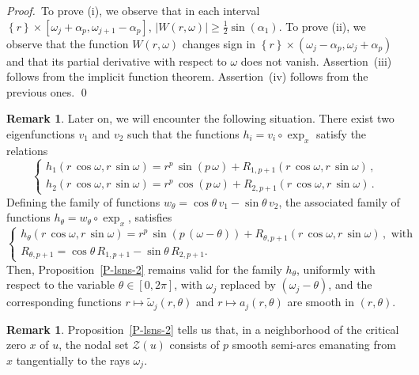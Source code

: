 \documentclass[12pt,a4paper]{amsart}
\theoremstyle{plain} %
\theoremstyle{definition}
\newtheorem{remark}[theorem]{Remark}
\numberwithin{equation}{section}
\numberwithin{figure}{section}
\numberwithin{table}{section}
\newcommand{\cZ}{\mathcal{Z}}
\newcommand{\pf}{\emph{Proof.~}}
\newcommand{\set}[1]{\left\lbrace #1 \right\rbrace}
\newcommand{\omegat}{\widetilde{\omega}}
\begin{document}
\pf To prove (i), we observe that in each interval $\set{r} \times \left[ \omega_j+\alpha_p,\omega_{j+1}-\alpha_p\right]$, $|W(r,\omega)| \ge \frac 12 \sin(\alpha_1)$. To prove (ii), we observe that the function $W(r,\omega)$ changes sign in $\set{r}\times \left( \omega_j-\alpha_p,\omega_j+\alpha_p\right)$ and that its partial derivative with respect to $\omega$ does not vanish.  Assertion~(iii) follows from the implicit function theorem. Assertion~(iv) follows from the previous ones. \hfill \qed

\begin{remark}\label{R-lsns-4}
Later on, we will encounter the following situation. There exist two eigenfunctions $v_1$ and $v_2$ such that the functions $h_i = v_i \circ \exp_x$ satisfy the relations
%
\begin{equation}%
\left\{
\begin{array}{l}
h_1(r\, \cos\omega, r\, \sin\omega) = r^p \, \sin(p\,\omega) + R_{1,p+1}(r\, \cos \omega, r\, \sin\omega)\,,\\[5pt]
h_2(r\, \cos\omega, r\, \sin\omega) = r^p \, \cos(p\,\omega) + R_{2,p+1}(r\, \cos \omega, r\, \sin\omega)\,.
\end{array}%
\right.
\end{equation}
%
Defining the family of functions $w_{\theta} = \cos\theta \, v_1 - \sin\theta \, v_2$, the associated family of functions $h_{\theta} = w_{\theta}\circ \exp_x$, satisfies
%
\begin{equation}%
\left\{
\begin{array}{l}
h_{\theta}(r\, \cos\omega, r\, \sin\omega) = r^p \, \sin(p\,(\omega - \theta)) + R_{\theta,p+1}(r\, \cos\omega, r\, \sin\omega)\,, \text{~with}\\[5pt]
R_{\theta,p+1} = \cos\theta \, R_{1,p+1} - \sin\theta \, R_{2,p+1}.
\end{array}%
\right.
\end{equation}
%
Then, Proposition~\ref{P-lsns-2} remains valid for the family $h_{\theta}$, uniformly with respect to the variable $\theta \in [0,2\pi]$, with $\omega_j$ replaced by $(\omega_j-\theta)$, and the corresponding functions $r \mapsto \omegat_j(r,\theta)$ and $r \mapsto a_j(r,\theta)$ are smooth in $(r,\theta)$.
\end{remark}%


\begin{remark}\label{R-lsns-6}
Proposition~\ref{P-lsns-2} tells us that, in a neighborhood of the critical zero $x$ of $u$, the nodal set $\cZ(u)$ consists of $p$ smooth semi-arcs emanating from $x$ tangentially to the rays $\omega_j$.
\end{remark}%
\end{document}
